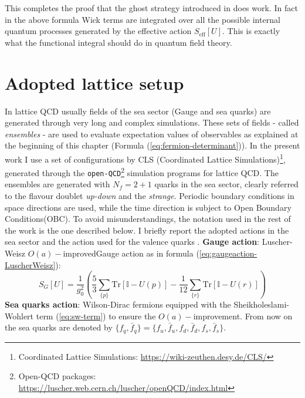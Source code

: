 \documentclass[english, LaM, oneside, noexaminfo]{sapthesis}
\newcommand{\oaid}{$O(a)-$improved}
\newcommand{\oait}{$O(a)-$improvement}
\newcommand{\obc}{Open Boundary Conditions}
\newcommand{\tr}{\text{Tr}}
\begin{document}
This completes the proof that the ghost strategy introduced in \cite{Morel} does work.
In fact in the above formula Wick terms are integrated over all the possible internal quantum processes generated by the effective action $S_\text{eff}[U]$.
This is exactly what the functional integral should do in quantum field theory.

\section{Adopted lattice setup}\label{sec:setup}
\noindent
In lattice QCD usually fields of the sea sector (Gauge and sea quarks) are generated through very long and complex simulations.
These sets of fields - called {\it ensembles} - are used to evaluate expectation values of observables as explained at the beginning of this chapter (Formula (\ref{eq:fermion-determinant})).
In the present work I use a set of configurations by CLS \cite{Bruno} (Coordinated Lattice Simulations)\footnote{Coordinated Lattice Simulations: \href{https://wiki-zeuthen.desy.de/CLS/}{https://wiki-zeuthen.desy.de/CLS/}}, generated through the \texttt{open-QCD}\footnote{Open-QCD packages: \href{https://luscher.web.cern.ch/luscher/openQCD/index.html}{https://luscher.web.cern.ch/luscher/openQCD/index.html}} simulation programs for lattice QCD.
The ensembles are generated with $N_f = 2+1$ quarks in the sea sector, clearly referred to the flavour doublet {\it up-down} and the {\it strange}.
Periodic boundary conditions in space directions are used, while the time direction is subject to \obc\space (OBC).
To avoid misunderstandings, the notation used in the rest of the work is the one described below.
I briefly report the adopted actions in the sea sector and the action used for the valence quarks \cite{tmMixAct}.
\newline\newline
{\bf Gauge action}: Luscher-Weisz \oaid\space Gauge action as in formula (\ref{eq:gaugeaction-LuscherWeisz}):
\begin{equation*}
    S_G[U] = \frac{1}{g_0^2} \left( \frac{5}{3} \sum_{\{p\}} \tr \left[ \mathbb{I} - U(p)\right] - \frac{1}{12} \sum_{\{r\}} \tr \left[ \mathbb{I} - U(r)\right] \right) 
\end{equation*}
\newline
{\bf Sea quarks action}: Wilson-Dirac fermions equipped with the Sheikholeslami-Wohlert term (\ref{eq:sw-term}) to ensure the \oait.
From now on the sea quarks are denoted by $\{f_q, \bar f_q\} = \{f_u, \bar f_u, f_d, \bar f_d, f_s, \bar f_s\}$.
\end{document}
